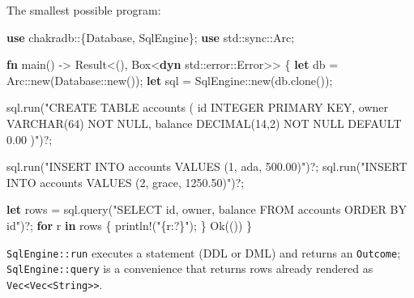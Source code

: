 \documentclass[
  11pt,
  openany]{book}
\newenvironment{Shaded}{}{}
\newcommand{\BuiltInTok}[1]{\textcolor[rgb]{0.00,0.50,0.00}{#1}}
\newcommand{\ConstantTok}[1]{\textcolor[rgb]{0.53,0.00,0.00}{#1}}
\newcommand{\ControlFlowTok}[1]{\textcolor[rgb]{0.00,0.44,0.13}{\textbf{#1}}}
\newcommand{\DataTypeTok}[1]{\textcolor[rgb]{0.56,0.13,0.00}{#1}}
\newcommand{\KeywordTok}[1]{\textcolor[rgb]{0.00,0.44,0.13}{\textbf{#1}}}
\newcommand{\NormalTok}[1]{#1}
\newcommand{\OperatorTok}[1]{\textcolor[rgb]{0.40,0.40,0.40}{#1}}
\newcommand{\PreprocessorTok}[1]{\textcolor[rgb]{0.74,0.48,0.00}{#1}}
\newcommand{\StringTok}[1]{\textcolor[rgb]{0.25,0.44,0.63}{#1}}
\begin{document}
The smallest possible program:

\begin{Shaded}
\begin{Highlighting}[]
\KeywordTok{use} \PreprocessorTok{chakradb::}\OperatorTok{\{}\NormalTok{Database}\OperatorTok{,}\NormalTok{ SqlEngine}\OperatorTok{\};}
\KeywordTok{use} \PreprocessorTok{std::sync::}\NormalTok{Arc}\OperatorTok{;}

\KeywordTok{fn}\NormalTok{ main() }\OperatorTok{{-}\textgreater{}} \DataTypeTok{Result}\OperatorTok{\textless{}}\NormalTok{()}\OperatorTok{,} \DataTypeTok{Box}\OperatorTok{\textless{}}\KeywordTok{dyn} \PreprocessorTok{std::error::}\BuiltInTok{Error}\OperatorTok{\textgreater{}\textgreater{}} \OperatorTok{\{}
    \KeywordTok{let}\NormalTok{ db }\OperatorTok{=} \PreprocessorTok{Arc::}\NormalTok{new(}\PreprocessorTok{Database::}\NormalTok{new())}\OperatorTok{;}
    \KeywordTok{let}\NormalTok{ sql }\OperatorTok{=} \PreprocessorTok{SqlEngine::}\NormalTok{new(db}\OperatorTok{.}\NormalTok{clone())}\OperatorTok{;}

\NormalTok{    sql}\OperatorTok{.}\NormalTok{run(}\StringTok{"CREATE TABLE accounts (}
\StringTok{        id     INTEGER PRIMARY KEY,}
\StringTok{        owner  VARCHAR(64) NOT NULL,}
\StringTok{        balance DECIMAL(14,2) NOT NULL DEFAULT 0.00}
\StringTok{    )"}\NormalTok{)}\OperatorTok{?;}

\NormalTok{    sql}\OperatorTok{.}\NormalTok{run(}\StringTok{"INSERT INTO accounts VALUES (1, \textquotesingle{}ada\textquotesingle{}, 500.00)"}\NormalTok{)}\OperatorTok{?;}
\NormalTok{    sql}\OperatorTok{.}\NormalTok{run(}\StringTok{"INSERT INTO accounts VALUES (2, \textquotesingle{}grace\textquotesingle{}, 1250.50)"}\NormalTok{)}\OperatorTok{?;}

    \KeywordTok{let}\NormalTok{ rows }\OperatorTok{=}\NormalTok{ sql}\OperatorTok{.}\NormalTok{query(}\StringTok{"SELECT id, owner, balance FROM accounts ORDER BY id"}\NormalTok{)}\OperatorTok{?;}
    \ControlFlowTok{for}\NormalTok{ r }\KeywordTok{in}\NormalTok{ rows }\OperatorTok{\{}
        \PreprocessorTok{println!}\NormalTok{(}\StringTok{"\{r:?\}"}\NormalTok{)}\OperatorTok{;}
    \OperatorTok{\}}
    \ConstantTok{Ok}\NormalTok{(())}
\OperatorTok{\}}
\end{Highlighting}
\end{Shaded}

\texttt{SqlEngine::run} executes a statement (DDL or DML) and returns an
\texttt{Outcome}; \texttt{SqlEngine::query} is a convenience that
returns rows already rendered as
\texttt{Vec\textless{}Vec\textless{}String\textgreater{}\textgreater{}}.
\end{document}
